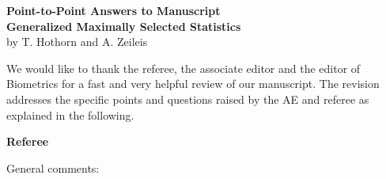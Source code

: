 \documentclass[11pt,a4paper]{article}
\begin{document}
\begin{center}
\textbf{\large Point-to-Point Answers to Manuscript \\
Generalized Maximally Selected Statistics} \\
by T. Hothorn and A. Zeileis
\end{center}

We would like to thank the referee, the associate editor and the editor of Biometrics 
for a fast and very helpful review of our manuscript. The revision addresses
the specific points and questions raised by the AE and referee as explained 
in the following.

\vspace*{1cm}

\textbf{\large Referee}

General comments:
\end{document}
